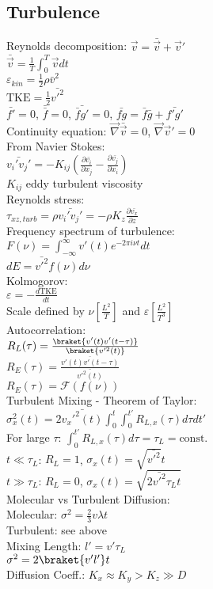 \subsection*{Turbulence}
Reynolds decomposition: $\vec{v}=\bar{\vec{v}}+\vec{v}'$\\
$\bar{\vec{v}}=\frac{1}{T}\int_0^T\vec{v}dt$\\
$\varepsilon_{kin}=\frac{1}{2}\rho\bar{v}^2$\\
$\text{TKE}=\frac{1}{2}\bar{v'^2}$\\
$\bar{f'}=0$, $\bar{\bar{f}}=0$, $\bar{\bar{f}g'}=0$, $\bar{fg}=\bar{f}\bar{g}+\bar{f'g'}$\\
Continuity equation: $\vec{\nabla}\bar{\vec{v}}=0$, $\vec{\nabla}\vec{v}'=0$\\
From Navier Stokes:\\
$\bar{v_i'v_j'}=-K_{ij}\left(\frac{\partial\bar{v_i}}{\partial x_j}-\frac{\partial\bar{v_j}}{\partial x_i}\right)$\\
$K_{ij}$ eddy turbulent viscosity\\
Reynolds stress:\\
$\tau_{xz,turb}=\rho\bar{v_i'v_j'}=-\rho K_z\frac{\partial\bar{v_x}}{\partial z}$\\
Frequency spectrum of turbulence:\\
$F(\nu)=\int_{-\infty}^{\infty}v'(t)e^{-2\pi i\nu t}dt$\\
$dE = \bar{v'^2}f(\nu)d\nu$\\
Kolmogorov:\\
$\varepsilon = -\frac{d\text{TKE}}{dt}$\\
Scale defined by $\nu [\frac{L^2}{T}]$ and $\varepsilon [\frac{L^2}{T^3}]$\\
Autocorrelation:\\
$R_L(\tau)=\frac{\braket{v'(t)v'(t-\tau)}}{\braket{v'^2(t)}}$\\
$R_E(\tau)=\frac{\bar{v'(t)v'(t-\tau)}}{\bar{v'^2(t)}}$\\
$R_E(\tau)=\mathcal{F}(f(\nu))$\\
Turbulent Mixing - Theorem of Taylor:\\
$\sigma_x^2(t)=2\bar{v_x'^2(t)}\int_0^t\int_0^{t'}R_{L,x}(\tau)d\tau dt'$\\
For large $\tau$: $\int_0^{t'}R_{L,x}(\tau)d\tau=\tau_L=\text{const.}$\\
$t\ll\tau_L$: $R_L=1$, $\sigma_x(t)=\sqrt{\bar{v'^2}}t$\\
$t\gg\tau_L$: $R_L=0$, $\sigma_x(t)=\sqrt{2\bar{v'^2}\tau_L t}$\\
Molecular vs Turbulent Diffusion:\\
Molecular: $\sigma^2=\frac{2}{3}v\lambda t$\\
Turbulent: see above\\
Mixing Length: $l'=v'\tau_L$\\
$\sigma^2=2\braket{v'l'}t$\\
Diffusion Coeff.: $K_x \approx K_y > K_z \gg D$
